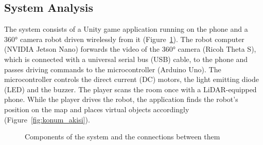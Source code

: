 \documentclass[11pt,a4paper]{article}
\begin{document}
\subsection{System Analysis}
\label{subsec:sistem_analizi}
The system consists of a Unity game application running on the phone and a 360° camera robot driven wirelessly from it (Figure~\ref{fig:sistem_bilesenleri}). The robot computer (NVIDIA Jetson Nano) forwards the video of the 360° camera (Ricoh Theta S), which is connected with a universal serial bus (USB) cable, to the phone and passes driving commands to the microcontroller (Arduino Uno). The microcontroller controls the direct current (DC) motors, the light emitting diode (LED) and the buzzer. The player scans the room once with a LiDAR-equipped phone. While the player drives the robot, the application finds the robot's position on the map and places virtual objects accordingly (Figure~\ref{fig:konum_akisi}).

\begin{figure}[H]
\centering
{}
\caption{Components of the system and the connections between them}
\label{fig:sistem_bilesenleri}
\end{figure}
\end{document}
